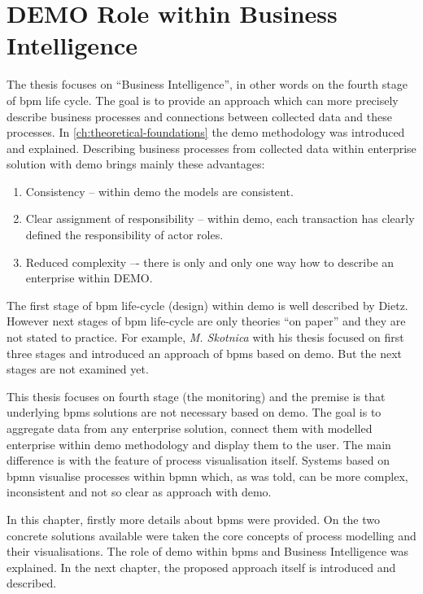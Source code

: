 \section{DEMO Role within Business Intelligence}
The thesis focuses on ``Business Intelligence'', in other words on the fourth stage of \gls{bpm} life cycle. The goal is to provide an approach which can more precisely describe business processes and connections between collected data and these processes. In \cref{ch:theoretical-foundations} the \gls{demo} methodology was introduced and explained. Describing business processes from collected data within enterprise solution with \gls{demo} brings mainly these advantages: 
\begin{enumerate}
\item Consistency -- within \gls{demo} the models are consistent. 
\item Clear assignment of responsibility -- within \gls{demo}, each transaction has clearly defined the responsibility of actor roles. 
\item Reduced complexity –- there is only and only one way how to describe an enterprise within DEMO.
\end{enumerate}

The first stage of \gls{bpm} life-cycle (design) within \gls{demo} is well described by Dietz\cite{dietz-essence-2015}\cite{dietz-enterprise-2006}. However next stages of \gls{bpm} life-cycle are only theories ``on paper'' and they are not stated to practice. For example, \textit{M. Skotnica}\cite{diploma-skotnica-2016} with his thesis focused on first three stages and introduced an approach of \gls{bpms} based on \gls{demo}. But the next stages are not examined yet.

This thesis focuses on fourth stage (the monitoring) and the premise is that underlying \gls{bpms} solutions are not necessary based on \gls{demo}. The goal is to aggregate data from any enterprise solution, connect them with modelled enterprise within \gls{demo} methodology and display them to the user. The main difference is with the feature of process visualisation itself. Systems based on \gls{bpmn} visualise processes within \gls{bpmn} which, as was told, can be more complex, inconsistent and not so clear as approach with \gls{demo}. 

In this chapter, firstly more details about \gls{bpms} were provided. On the two concrete solutions available were taken the core concepts of process modelling and their visualisations. The role of \gls{demo} within \gls{bpms} and Business Intelligence was explained. In the next chapter, the proposed approach itself is introduced and described.


